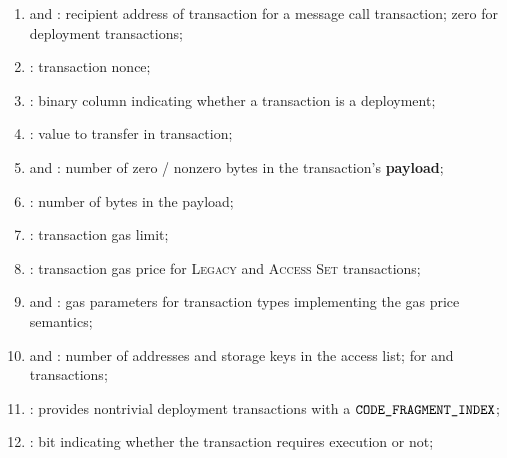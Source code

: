 \begin{enumerate}[resume]
	\item
		\txnDataRlpToAddrHi{} and
		\txnDataRlpToAddrLo{}:
		recipient address of transaction for a message call transaction;
		zero for deployment transactions;
	\item
		\txnDataRlpNonce{}:
		transaction nonce;
	\item
		\txnDataRlpIsDep{}:
		binary column indicating whether a transaction is a deployment;
	\item
		\txnDataRlpValue{}:
		value to transfer in transaction;
	\item
		\txnDataRlpNumberOfZeroBytes{} and
		\txnDataRlpNumberOfNonzeroBytes{}:
		number of zero / nonzero bytes in the transaction's \textbf{payload};
	\item
		\txnDataRlpDataSize{}:
		number of bytes in the payload;
	\item
		\txnDataRlpGasLimit{}:
		transaction gas limit;
	\item
		\txnDataRlpGasPrice{}:
		transaction gas price for
		\textsc{Legacy} and
		\textsc{Access Set} transactions;
	\item
		\txnDataRlpMaxPriorityFeePerGas{}  and
		\txnDataRlpMaxFeePerGas{}:
		gas parameters for transaction types implementing the
		\cite{EIP-1559} gas price semantics;
	\item
		\txnDataRlpNumberOfAccessListAddresses{} and
		\txnDataRlpNumberOfAccessListStorageKeys{}:
		number of addresses and storage keys in the access list;
		for \cite{EIP-2929} and \cite{EIP-2930} transactions;
	\item
		\txnDataRlpCfi{}:
		provides nontrivial deployment transactions with a $\texttt{CODE\_FRAGMENT\_INDEX}$;
	\item
		\txnDataRlpRequiresEvmExecution{}:
		bit indicating whether the transaction requires \evm{} execution or not;
\end{enumerate}
